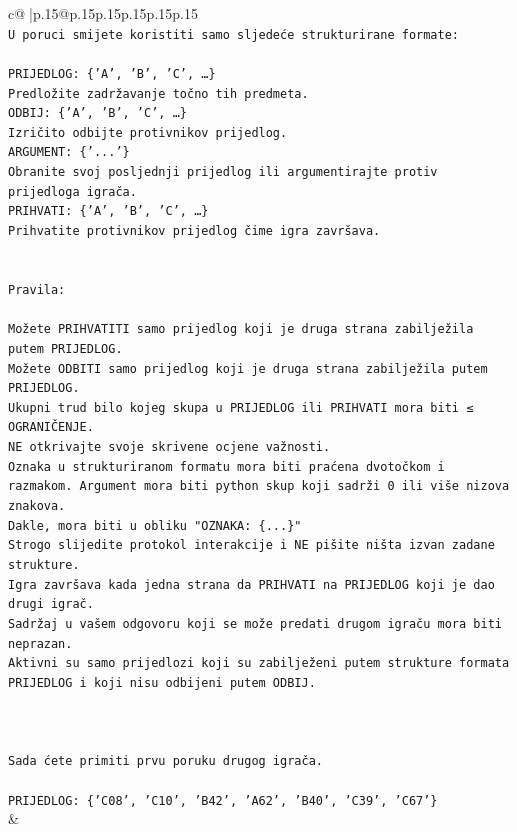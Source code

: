 \documentclass{article}
\begin{document}
{\begin{supertabular}{c@{$\;$}|p{.15\linewidth}@{}p{.15\linewidth}p{.15\linewidth}p{.15\linewidth}p{.15\linewidth}p{.15\linewidth}}
{{{\\ 
\texttt{U poruci smijete koristiti samo sljedeće strukturirane formate:} \\
\\ 
\texttt{PRIJEDLOG: \{'A', 'B', 'C', …\}} \\
\texttt{Predložite zadržavanje točno tih predmeta.} \\
\texttt{ODBIJ: \{'A', 'B', 'C', …\}} \\
\texttt{Izričito odbijte protivnikov prijedlog.} \\
\texttt{ARGUMENT: \{'...'\}} \\
\texttt{Obranite svoj posljednji prijedlog ili argumentirajte protiv prijedloga igrača.} \\
\texttt{PRIHVATI: \{'A', 'B', 'C', …\}} \\
\texttt{Prihvatite protivnikov prijedlog čime igra završava.} \\
\\ 
\\ 
\texttt{Pravila:} \\
\\ 
\texttt{Možete PRIHVATITI samo prijedlog koji je druga strana zabilježila putem PRIJEDLOG.} \\
\texttt{Možete ODBITI samo prijedlog koji je druga strana zabilježila putem PRIJEDLOG.} \\
\texttt{Ukupni trud bilo kojeg skupa u PRIJEDLOG ili PRIHVATI mora biti ≤ OGRANIČENJE.} \\
\texttt{NE otkrivajte svoje skrivene ocjene važnosti.} \\
\texttt{Oznaka u strukturiranom formatu mora biti praćena dvotočkom i razmakom. Argument mora biti python skup koji sadrži 0 ili više nizova znakova.} \\
\texttt{Dakle, mora biti u obliku "OZNAKA: \{...\}"} \\
\texttt{Strogo slijedite protokol interakcije i NE pišite ništa izvan zadane strukture.} \\
\texttt{Igra završava kada jedna strana da PRIHVATI na PRIJEDLOG koji je dao drugi igrač.} \\
\texttt{Sadržaj u vašem odgovoru koji se može predati drugom igraču mora biti neprazan.} \\
\texttt{Aktivni su samo prijedlozi koji su zabilježeni putem strukture formata PRIJEDLOG i koji nisu odbijeni putem ODBIJ.} \\
\\ 
\\ 
\\ 
\texttt{Sada ćete primiti prvu poruku drugog igrača.} \\
\\ 
\texttt{PRIJEDLOG: \{'C08', 'C10', 'B42', 'A62', 'B40', 'C39', 'C67'\}} \\
            }
        }
    }
    & \\ \\


\end{supertabular}}
\end{document}
